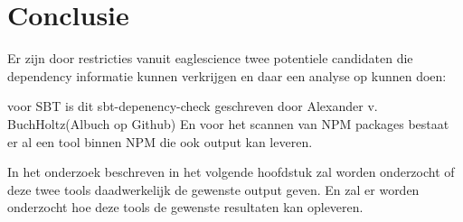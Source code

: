 \section{Conclusie}\label{sec:conclusie}
Er zijn door restricties vanuit eaglescience twee potentiele candidaten die dependency informatie kunnen verkrijgen en daar een analyse op kunnen doen:

voor SBT is dit sbt-depenency-check geschreven door Alexander v. BuchHoltz(Albuch op Github)
En voor het scannen van NPM packages bestaat er al een tool binnen NPM die ook output kan leveren.

In het onderzoek beschreven in het volgende hoofdstuk zal worden onderzocht of deze twee tools daadwerkelijk de gewenste output geven. En zal er worden onderzocht hoe deze tools de gewenste resultaten kan opleveren.
